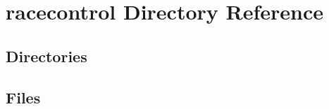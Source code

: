 \section{racecontrol Directory Reference}
\label{dir_4a21035cabfd775cc3c4cdd2792be23a}
\subsection*{Directories}
\begin{DoxyCompactItemize}
\end{DoxyCompactItemize}
\subsection*{Files}
\begin{DoxyCompactItemize}
\end{DoxyCompactItemize}

